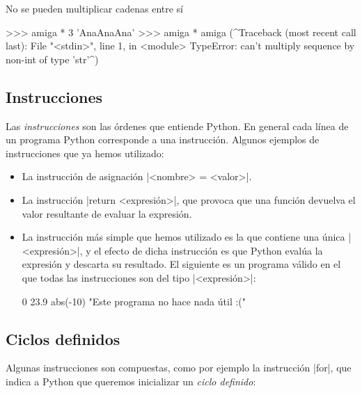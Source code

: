 \begin{itemize}
\begin{itemize}
\begin{atencion}
No se pueden multiplicar cadenas entre sí

\begin{codigo-python-sn}
>>> amiga * 3
'AnaAnaAna'
>>> amiga * amiga
(^Traceback (most recent call last):
  File "<stdin>", line 1, in <module>
TypeError: can't multiply sequence by non-int of type 'str'^)
\end{codigo-python-sn}
\end{atencion}

\end{itemize}

\end{itemize}

\subsection{Instrucciones}

Las \emph{instrucciones} son las órdenes que entiende Python.  En general cada
línea de un programa Python corresponde a una instrucción.  Algunos ejemplos de
instrucciones que ya hemos utilizado:

\begin{itemize}
\item La instrucción de asignación |<nombre> = <valor>|.

\item La instrucción |return <expresión>|, que provoca que una función devuelva
    el valor resultante de evaluar la expresión.

\item \label{instruccion-expresion} La instrucción más simple que hemos utilizado es la que contiene una
    única |<expresión>|, y el efecto de dicha instrucción es que Python evalúa
    la expresión y descarta su resultado. El siguiente es un programa válido
    en el que todas las instrucciones son del tipo |<expresión>|:

\begin{codigo-python-sn}
0
23.9
abs(-10)
"Este programa no hace nada útil :("
\end{codigo-python-sn}

\end{itemize}

\subsection{Ciclos definidos}
Algunas instrucciones son compuestas, como por ejemplo la instrucción |for|,
que indica a Python que queremos inicializar un \emph{ciclo definido}:

